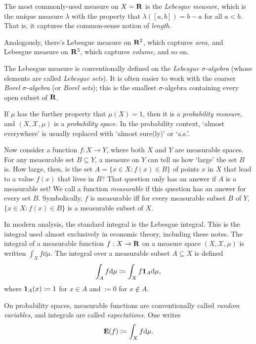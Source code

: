 \documentclass[11pt,letterpaper,reqno,oneside]{book}
\begin{document}
\begin{appendices}
\begin{example}
	\label{example:lebesgue_measure}
	The most commonly-used measure on $X=\mathbf{R}$ is the \emph{Lebesgue measure,}
	which is the unique measure $\lambda$ with the property that
	$\lambda([a,b]) = b-a$ for all $a<b$.
	That is, it captures the common-sense notion of \emph{length.}

	Analogously, there's Lebesgue measure on $\mathbf{R}^2$, which captures \emph{area,} and Lebesgue measure on $\mathbf{R}^3$, which captures \emph{volume,} and so on.

	The Lebesgue measure is conventionally defined on the \emph{Lebesgue $\sigma$-algebra} (whose elements are called \emph{Lebesgue sets}).
	It is often easier to work with the coarser \emph{Borel $\sigma$-algebra} (or \emph{Borel sets}); this is the smallest $\sigma$-algebra containing every open subset of $\mathbf{R}$.
\end{example}

If $\mu$ has the further property that $\mu(X)=1$, then it is a \emph{probability measure,}
and $(X,\mathcal{X},\mu)$ is a \emph{probability space.}
In the probability context, `almost everywhere' is usually replaced with `almost sure(ly)' or `a.s.'.

Now consider a function $f : X \to Y$, where both $X$ and $Y$ are measurable spaces. For any measurable set $B \subseteq Y$, a measure on $Y$ can tell us how `large' the set $B$ is.
How large, then, is the set $A = \{ x \in X : f(x) \in B \}$ of points $x$ in $X$ that lead to a value $f(x)$ that lives in $B$?
That question only has an answer if $A$ is a measurable set!
We call a function \emph{measurable} if this question has an answer for every set $B$.
Symbolically, $f$ is measurable iff for every measurable subset $B$ of $Y$, $\{ x \in X : f(x) \in B \}$ is a measurable subset of $X$.

In modern analysis, the standard integral is the Lebesgue integral.
This is the integral used almost exclusively in economic theory, including these notes.
The integral of a measurable function $f : X \to \mathbf{R}$ on a measure space $(X,\mathcal{X},\mu)$ is written $\int_X f \dd \mu$.
The integral over a measurable subset $A \subseteq X$ is defined
%
\begin{equation*}
	\int_A f \mathrm{d} \mu \coloneqq \int_X f \boldsymbol{1}_A \mathrm{d} \mu ,
\end{equation*}
%
where $\boldsymbol{1}_A(x) \coloneqq 1$ for $x \in A$ and $\coloneqq 0$ for $x \notin A$.

On probability spaces, measurable functions are conventionally called \emph{random variables,}
and integrals are called \emph{expectations.}
One writes
%
\begin{equation*}
	\mathbf{E}( f ) \coloneqq \int_X f \mathrm{d} \mu .
\end{equation*}


\end{appendices}
\end{document}
